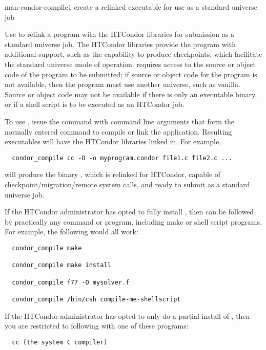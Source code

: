 \begin{ManPage}{}{man-condor-compile}{1}
{create a relinked executable for use as a standard universe job}


\Synopsis {}

\Description

Use  to relink a program with the HTCondor libraries for
submission as a standard universe job.
The HTCondor libraries provide the program with additional support, such
as the capability to produce checkpoints, 
which facilitate the standard universe mode of operation.
 requires access to the source or object code of the
program to be submitted; if source or object code for the program is
not available,
then the program must use another universe, such as vanilla.
Source or object code may not be available if there is 
only an executable binary, or if a shell script is to be executed as
an HTCondor job. 

To use , issue the command
 with command line arguments that form
the normally entered command to compile or link the application.
Resulting executables will have the HTCondor libraries linked in.
For example, 
\footnotesize
\begin{verbatim}
  condor_compile cc -O -o myprogram.condor file1.c file2.c ... 
\end{verbatim}
\normalsize
will produce the binary , 
which is relinked for HTCondor,
capable of checkpoint/migration/remote system calls, and ready to
submit as a standard universe job.  

If the HTCondor administrator has opted to fully install
, then  can be followed by practically
any command or program, including make or shell script programs.
For example, the following would all work:
\footnotesize
\begin{verbatim}
  condor_compile make 

  condor_compile make install 

  condor_compile f77 -O mysolver.f 

  condor_compile /bin/csh compile-me-shellscript 
\end{verbatim}
\normalsize

If the HTCondor administrator has opted to only do a partial install of
, then you are restricted to following 
with one of these programs:  
\footnotesize
\begin{verbatim}
  cc (the system C compiler) 


\end{verbatim}
\end{ManPage}
